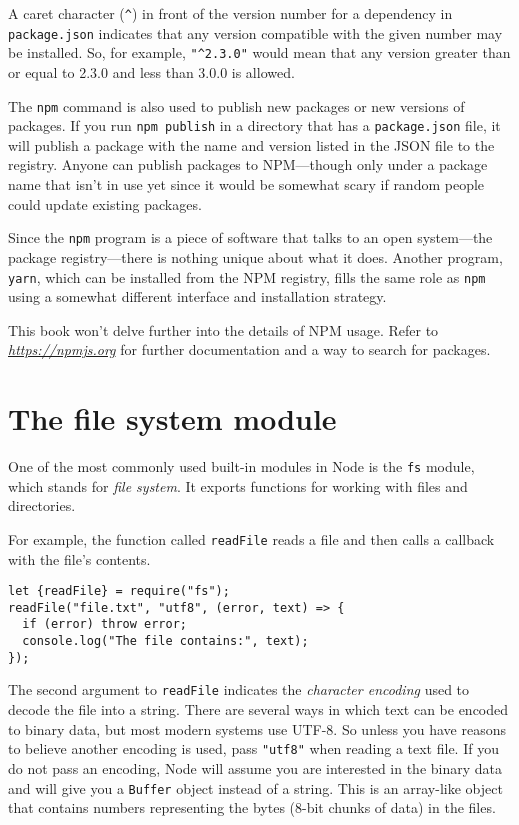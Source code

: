 A caret character (\lstinline`^`) in front of the version number for a dependency in \lstinline`package.json` indicates that any version compatible with the given number may be installed. So, for example, \lstinline`"^2.3.0"` would mean that any version greater than or equal to 2.3.0 and less than 3.0.0 is allowed.

The \lstinline`npm` command is also used to publish new packages or new versions of packages. If you run \lstinline`npm publish` in a directory that has a \lstinline`package.json` file, it will publish a package with the name and version listed in the JSON file to the registry. Anyone can publish packages to NPM—though only under a package name that isn't in use yet since it would be somewhat scary if random people could update existing packages.

Since the \lstinline`npm` program is a piece of software that talks to an open system—the package registry—there is nothing unique about what it does. Another program, \lstinline`yarn`, which can be installed from the NPM registry, fills the same role as \lstinline`npm` using a somewhat different interface and installation strategy.

This book won't delve further into the details of NPM usage. Refer to \href{https://npmjs.org}{\emph{https://npmjs.org}} for further documentation and a way to search for packages.

\section{The file system module}

One of the most commonly used built-in modules in Node is the \lstinline`fs` module, which stands for \emph{file system}. It exports functions for working with files and directories.

For example, the function called \lstinline`readFile` reads a file and then calls a callback with the file's contents.

\begin{lstlisting}
let {readFile} = require("fs");
readFile("file.txt", "utf8", (error, text) => {
  if (error) throw error;
  console.log("The file contains:", text);
});
\end{lstlisting}
\noindent{}

The second argument to \lstinline`readFile` indicates the \emph{character
encoding} used to decode the file into a string. There are several ways in which text can be encoded to binary data, but most modern systems use UTF-8. So unless you have reasons to believe another encoding is used, pass \lstinline`"utf8"` when reading a text file. If you do not pass an encoding, Node will assume you are interested in the binary data and will give you a \lstinline`Buffer` object instead of a string. This is an array-like object that contains numbers representing the bytes (8-bit chunks of data) in the files.

